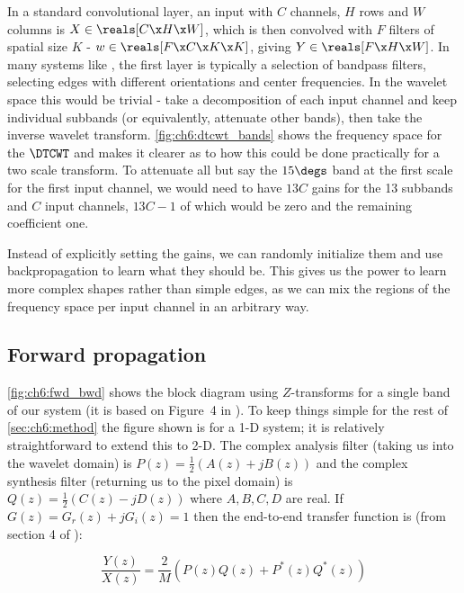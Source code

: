 In a standard convolutional layer, an input with $C$ channels, $H$ rows and $W$
columns is $X \in \reals[C\x H\x W]$, which is then convolved with $F$ filters
of spatial size $K$ - $w \in \reals[F \x C\x K\x K]$, giving $Y \in \reals[F\x
H\x W]$. In many systems like \cite{krizhevsky_imagenet_2012, he_deep_2015}, the
first layer is typically a selection of bandpass filters, selecting edges with
different orientations and center frequencies. In the wavelet space this would
be trivial - take a decomposition of each input channel and keep individual
subbands (or equivalently, attenuate other bands), then take the inverse wavelet
transform.  \autoref{fig:ch6:dtcwt_bands} shows the frequency space for the
$\DTCWT$ and makes it clearer as to how this could be done practically for a two
scale transform. To attenuate all but say the $15 \degs$ band at the first scale
for the first input channel, we would need to have $13C$ gains for the 13
subbands and $C$ input channels, $13C-1$ of which would be zero and the
remaining coefficient one.

Instead of explicitly setting the gains, we can randomly initialize them and use
backpropagation to learn what they should be. This gives us the power to learn
more complex shapes rather than simple edges, as we can mix the regions of the
frequency space per input channel in an arbitrary way. 

\subsection{Forward propagation}
\autoref{fig:ch6:fwd_bwd} shows the block diagram using $Z$-transforms for
a single band of our system (it is based on Figure~4 in
\cite{kingsbury_complex_2001}). To keep things simple for the rest of
\autoref{sec:ch6:method} the figure shown is for a 1-D system; it is relatively
straightforward to extend this to 2-D\cite{selesnick_dual-tree_2005}. The
complex analysis filter (taking us into the wavelet domain) is $P(z)
= \frac{1}{2}\left(A(z)+jB(z)\right)$ and the complex synthesis filter
(returning us to the pixel domain) is $Q(z) = \frac{1}{2}\left(C(z)
  - jD(z)\right)$ where $A,B,C,D$ are real.  If $G(z) = G_r(z) + jG_i(z) = 1$
  then the end-to-end transfer function is (from section 4 of
\cite{kingsbury_complex_2001}):

\begin{equation}\label{eq:ch6:end_to_end1}
\frac{Y(z)}{X(z)} = \frac{2}{M}\left(P(z)Q(z) + P^*(z)Q^*(z)\right)
\end{equation}

